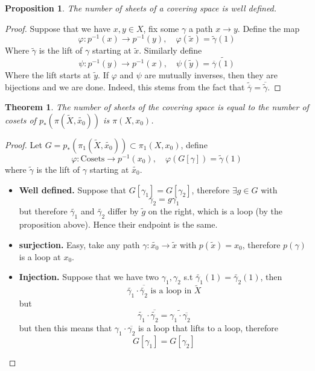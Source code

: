 \documentclass[11pt,a4paper]{article}
\theoremstyle{definition}
\theoremstyle{plain}
\newtheorem{theorem}[definition]{Theorem}
\newtheorem{proposition}[definition]{Proposition}
\theoremstyle{remark}
\newcommand{\1}{\mathbbm{1}}
\begin{document}
\begin{proposition}
    The number of sheets of a covering space is well defined.
\end{proposition}

\begin{proof}
    Suppose that we have $x, y \in X$, fix some $\gamma$ a path $x \to y$. Define the map 
    $$\varphi \colon p^{-1}(x) \to p^{-1}(y), \quad \varphi(\tilde{x}) = \tilde{\gamma}(1)$$
    Where $\tilde{\gamma}$ is the lift of $\gamma$ starting at $\tilde{x}$. Similarly define 
    $$\psi \colon p^{-1}(y) \to p^{-1}(x), \quad \psi(\tilde{y}) = \tilde{\overline{\gamma}(1)}$$
    Where the lift starts at $\tilde{y}$. If $\varphi$ and $\psi$ are mutually inverses, then  
    they are bijections and we are done. Indeed, this stems from the fact that $\tilde{\overline{\gamma}} = \overline{\tilde{\gamma}}$.
\end{proof}

\begin{theorem}
    The number of sheets of the covering space is equal to the number of cosets of $p_*(\pi(\tilde{X}, \tilde{x_0}))$ is $\pi(X,x_0)$. 
\end{theorem}

\begin{proof}
    Let $G = p_*(\pi_1(\tilde{X}, \tilde{x_0})) \subset \pi_1(X, x_0)$, define 
    $$\varphi \colon \text{Cosets} \to p^{-1}(x_0), \quad \varphi(G[\gamma]) = \tilde{\gamma}(1)$$
    where $\tilde{\gamma}$ is the lift of $\gamma$ starting at $\tilde{x_0}$.  
    \begin{itemize}
        \item \textbf{Well defined.} Suppose that $G[\gamma_1] = G[\gamma_2]$, therefore $\exists g \in G$ with 
        $$\gamma_2 = g \gamma_1$$
        but therefore $\tilde{\gamma_1}$ and $\tilde{\gamma_2}$ differ by $\tilde{g}$ on the right, which is a loop (by the proposition above). Hence 
        their endpoint is the same. 

        \item \textbf{surjection.} Easy, take any path $\gamma \colon \tilde{x_0} \to \tilde{x}$ with $p(\tilde{x}) = x_0$, therefore 
        $p(\gamma)$ is a loop at $x_0$. 

        \item \textbf{Injection.} Suppose that we have two $\gamma_1, \gamma_2$ s.t $\tilde{\gamma_1}(1) = \tilde{\gamma_2} (1)$, then 
        $$\tilde{\gamma_1} \cdot \overline{\tilde{\gamma_2}} \text{ is a loop in $\tilde{X}$}$$
        but 
        $$\tilde{\gamma_1} \cdot \overline{\tilde{\gamma_2}} = \tilde{\gamma_1 \cdot \overline{\gamma_2}}$$
        but then this means that $\gamma_1 \cdot \overline{\gamma_2}$ is a loop that lifts to a loop, therefore 
        $$G[\gamma_1] = G[\gamma_2]$$
    \end{itemize}
\end{proof}
\end{document}
